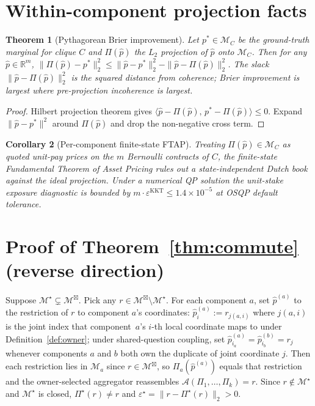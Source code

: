 \documentclass{article}
\theoremstyle{plain}
\newtheorem{theorem}{Theorem}[section]
\newtheorem{corollary}[theorem]{Corollary}
\theoremstyle{definition}
\theoremstyle{remark}
\newcommand{\MC}{\mathcal{M}_C}
\newcommand{\Mloc}{\mathcal{M}_a}
\newcommand{\Mprod}{\mathcal{M}^{\boxtimes}}
\newcommand{\Mjoint}{\mathcal{M}^{\star}}
\newcommand{\Pijoint}{\Pi^{\star}}
\newcommand{\Aagg}{\mathcal{A}}
\newcommand{\hpK}{\hat p}
\newcommand{\eps}{\varepsilon}
\begin{document}



\newpage
\appendix
\onecolumn
\raggedbottom

\section{Within-component projection facts}
\label{app:within}

\begin{theorem}[Pythagorean Brier improvement]
\label{thm:pyth}
Let $p^*\!\in\!\MC$ be the ground-truth marginal for clique $C$ and
$\Pi(\hpK)$ the $L_2$ projection of $\hpK$ onto $\MC$. Then for any
$\hpK\!\in\!\mathbb{R}^m$,
$\|\Pi(\hpK) - p^*\|_2^2 \le \|\hpK - p^*\|_2^2 - \|\hpK - \Pi(\hpK)\|_2^2$.
The slack $\|\hpK - \Pi(\hpK)\|_2^2$ is the squared distance from
coherence; Brier improvement is largest where pre-projection
incoherence is largest.
\end{theorem}

\begin{proof}
Hilbert projection theorem
\citep[Thm.~3.16]{bauschke2017convex} gives
$\langle \hpK - \Pi(\hpK),\,p^* - \Pi(\hpK)\rangle \le 0$. Expand
$\|\hpK - p^*\|^2$ around $\Pi(\hpK)$ and drop the non-negative
cross term.
\end{proof}

\begin{corollary}[Per-component finite-state FTAP]
\label{cor:noarb}
Treating $\Pi(\hpK)\!\in\!\MC$ as quoted unit-pay prices on the $m$
Bernoulli contracts of $C$, the finite-state Fundamental Theorem of
Asset Pricing rules out a state-independent Dutch book against the
ideal projection. Under a numerical QP solution the unit-stake
exposure diagnostic is bounded by
$m\cdot\eps^{\mathrm{KKT}}\!\le\!1.4\!\times\!10^{-5}$ at
\textsc{OSQP} default tolerance.
\end{corollary}

\section{Proof of Theorem~\ref{thm:commute} (reverse direction)}
\label{app:rev_proof}

Suppose $\Mjoint \subsetneq \Mprod$. Pick any
$r \in \Mprod \setminus \Mjoint$. For each component $a$, set
$\hpK^{(a)}$ to the restriction of $r$ to component $a$'s
coordinates: $\hpK^{(a)}_i := r_{j(a,i)}$ where $j(a,i)$ is the
joint index that component~$a$'s $i$-th local coordinate maps to
under Definition~\ref{def:owner}; under shared-question coupling,
set $\hpK^{(a)}_{i_a} = \hpK^{(b)}_{i_b} = r_j$ whenever components
$a$ and $b$ both own the duplicate of joint coordinate $j$. Then
each restriction lies in $\Mloc$ since $r \in \Mprod$, so
$\Pi_a(\hpK^{(a)})$ equals that restriction and the owner-selected
aggregator reassembles $\Aagg(\Pi_1,\dots,\Pi_k) = r$. Since
$r \notin \Mjoint$ and $\Mjoint$ is closed, $\Pijoint(r) \neq r$
and $\eps^\star = \|r - \Pijoint(r)\|_2 > 0$.
\end{document}
